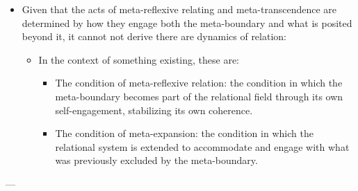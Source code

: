 \documentclass[11pt]{article}
\begin{document}
\begin{itemize}
\item Given that the acts of meta-reflexive relating and meta-transcendence are determined by how they engage both the meta-boundary and what is posited beyond it, it cannot not derive there are dynamics of relation:

\begin{itemize}
\item In the context of something existing, these are:

\begin{itemize}
\item The condition of meta-reflexive relation: the condition in which the meta-boundary becomes part of the relational field through its own self-engagement, stabilizing its own coherence.

\item The condition of meta-expansion: the condition in which the relational system is extended to accommodate and engage with what was previously excluded by the meta-boundary.
\end{itemize}
\end{itemize}
\end{itemize}


---
\end{document}
